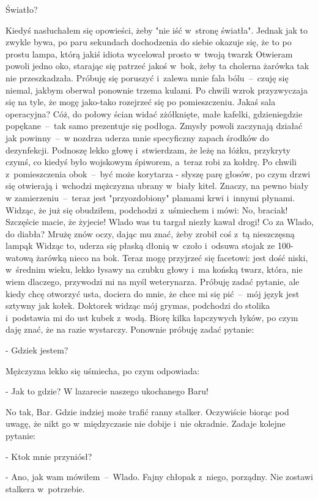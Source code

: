 \documentclass[../MAIN.tex]{subfiles}
\begin{document}
Światło?

Kiedyś nasłuchałem się opowieści, żeby "nie iść w~stronę
światła". Jednak jak to zwykle bywa, po paru sekundach
dochodzenia do siebie okazuje się, że to po prostu lampa, którą
jakiś idiota wycelował prosto w~twoją twarz\3k Otwieram powoli
jedno oko, starając się patrzeć jakoś w~bok, żeby ta cholerna
żarówka tak nie przeszkadzała. Próbuję się poruszyć i~zalewa
mnie fala bólu~--~czuję się niemal, jakbym oberwał ponownie
trzema kulami. Po chwili wzrok przyzwyczaja się na tyle, że
mogę jako-tako rozejrzeć się po pomieszczeniu. Jakaś sala
operacyjna? Cóż, do połowy ścian widać zżółknięte, małe
kafelki, gdzieniegdzie popękane~--~tak samo prezentuje się
podłoga. Zmysły powoli zaczynają działać jak powinny~--~w
nozdrza uderza mnie specyficzny zapach środków do dezynfekcji.
Podnoszę lekko głowę i~stwierdzam, że leżę na łóżku, przykryty
czymś, co kiedyś było wojskowym śpiworem, a~teraz robi za
kołdrę. Po chwili z~pomieszczenia obok~--~być może korytarza -
słyszę parę głosów, po czym drzwi się otwierają i~wchodzi
mężczyzna ubrany w~biały kitel. Znaczy, na pewno biały w
zamierzeniu~--~teraz jest "przyozdobiony" plamami krwi i~innymi
płynami. Widząc, że już się obudziłem, podchodzi z~uśmiechem i
mówi:
%
\sx No, braciak! Szczęście macie, że żyjecie! Wlado was tu
targał
niezły kawał drogi!
\qd
Co za Wlado, do diabła? Mrużę znów oczy, dając mu znać, żeby
zrobił coś z~tą nieszczęsną lampą\3k Widząc to, uderza się
płaską dłonią w~czoło i~odsuwa stojak ze 100-watową żarówką
nieco na bok. Teraz mogę przyjrzeć się facetowi: jest dość
niski, w~średnim wieku, lekko łysawy na czubku głowy i~ma
końską twarz, która, nie wiem dlaczego, przywodzi mi na myśl
weterynarza. Próbuję zadać pytanie, ale kiedy chcę otworzyć
usta, dociera do mnie, że chce mi się pić~--~mój język jest
sztywny jak kołek. Doktorek widząc mój grymas, podchodzi do
stolika i~podstawia mi do ust kubek z~wodą. Biorę kilka
łapczywych łyków, po czym daję znać, że na razie wystarczy.
Ponownie próbuję zadać pytanie:

- Gdzie\3k jestem?

Mężczyzna lekko się uśmiecha, po czym odpowiada:

- Jak to gdzie? W lazarecie naszego ukochanego Baru!

No tak, Bar. Gdzie indziej może trafić ranny stalker.
Oczywiście biorąc pod uwagę, że nikt go w~międzyczasie nie
dobije i~nie okradnie. Zadaje kolejne pytanie:

- Kto\3k mnie przyniósł?

- Ano, jak wam mówiłem~--~Wlado. Fajny chłopak z~niego,
porządny. Nie zostawi stalkera w~potrzebie.
\end{document}
